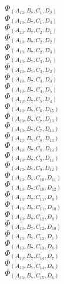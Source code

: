 \documentclass[14pt]{article}
\begin{document}
    $\Phi_{({A}_{13}, {B}_{7}, {C}_{1}, {D}_{2})}$ \\ 
    $\Phi_{({A}_{13}, {B}_{7}, {C}_{1}, {D}_{3})}$ \\ 
    $\Phi_{({A}_{13}, {B}_{7}, {C}_{2}, {D}_{1})}$ \\ 
    $\Phi_{({A}_{13}, {B}_{7}, {C}_{2}, {D}_{2})}$ \\ 
    $\Phi_{({A}_{13}, {B}_{7}, {C}_{2}, {D}_{3})}$ \\ 
    $\Phi_{({A}_{13}, {B}_{7}, {C}_{3}, {D}_{1})}$ \\ 
    $\Phi_{({A}_{13}, {B}_{7}, {C}_{3}, {D}_{2})}$ \\ 
    $\Phi_{({A}_{13}, {B}_{7}, {C}_{3}, {D}_{3})}$ \\ 
    $\Phi_{({A}_{13}, {B}_{7}, {C}_{4}, {D}_{5})}$ \\ 
    $\Phi_{({A}_{13}, {B}_{7}, {C}_{5}, {D}_{4})}$ \\ 
    $\Phi_{({A}_{13}, {B}_{7}, {C}_{6}, {D}_{15})}$ \\ 
    $\Phi_{({A}_{13}, {B}_{7}, {C}_{7}, {D}_{13})}$ \\ 
    $\Phi_{({A}_{13}, {B}_{7}, {C}_{7}, {D}_{14})}$ \\ 
    $\Phi_{({A}_{13}, {B}_{7}, {C}_{8}, {D}_{13})}$ \\ 
    $\Phi_{({A}_{13}, {B}_{7}, {C}_{8}, {D}_{14})}$ \\ 
    $\Phi_{({A}_{13}, {B}_{7}, {C}_{9}, {D}_{11})}$ \\ 
    $\Phi_{({A}_{13}, {B}_{7}, {C}_{9}, {D}_{12})}$ \\ 
    $\Phi_{({A}_{13}, {B}_{7}, {C}_{10}, {D}_{11})}$ \\ 
    $\Phi_{({A}_{13}, {B}_{7}, {C}_{10}, {D}_{12})}$ \\ 
    $\Phi_{({A}_{13}, {B}_{7}, {C}_{11}, {D}_{9})}$ \\ 
    $\Phi_{({A}_{13}, {B}_{7}, {C}_{11}, {D}_{10})}$ \\ 
    $\Phi_{({A}_{13}, {B}_{7}, {C}_{12}, {D}_{9})}$ \\ 
    $\Phi_{({A}_{13}, {B}_{7}, {C}_{12}, {D}_{10})}$ \\ 
    $\Phi_{({A}_{13}, {B}_{7}, {C}_{13}, {D}_{7})}$ \\ 
    $\Phi_{({A}_{13}, {B}_{7}, {C}_{13}, {D}_{8})}$ \\ 
    $\Phi_{({A}_{13}, {B}_{7}, {C}_{14}, {D}_{7})}$ \\ 
    $\Phi_{({A}_{13}, {B}_{7}, {C}_{14}, {D}_{8})}$ \\ 
    $\Phi_{({A}_{13}, {B}_{7}, {C}_{15}, {D}_{6})}$ \\ 
\end{document}
